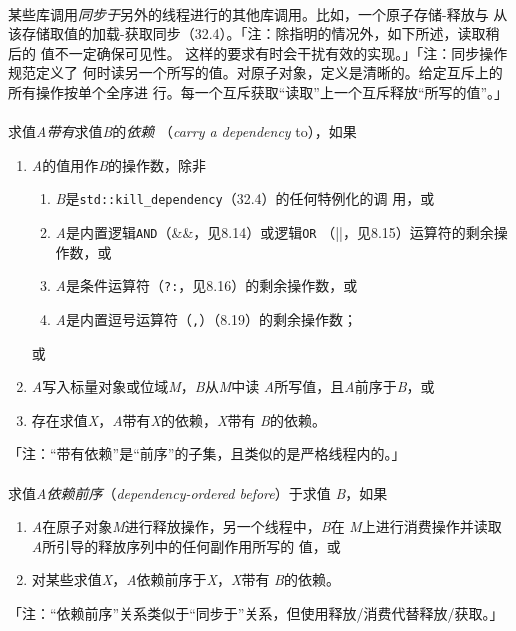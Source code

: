 \paragraph{}
某些库调用\textit{同步于}另外的线程进行的其他库调用。比如，一个原子存储-释放与
从该存储取值的加载-获取同步（32.4）。「注：除指明的情况外，如下所述，读取稍后的
值不一定确保可见性。 这样的要求有时会干扰有效的实现。」「注：同步操作规范定义了
何时读另一个所写的值。对原子对象，定义是清晰的。给定互斥上的所有操作按单个全序进
行。每一个互斥获取``读取''上一个互斥释放``所写的值''。」

\paragraph{}
求值\textit{A}\textit{带有}求值\textit{B}的\textit{依赖}
（\textit{carry a dependency} to），如果
\begin{enumerate}
  \item{\textit{A}的值用作\textit{B}的操作数，除非
      \begin{enumerate}
        \item{\textit{B}是\texttt{std::kill\_dependency}（32.4）的任何特例化的调
          用，或}
        \item{\textit{A}是内置逻辑\texttt{AND}（\&\&，见8.14）或逻辑\texttt{OR}
          （||，见8.15）运算符的剩余操作数，或}
        \item{\textit{A}是条件运算符（\texttt{?:}，见8.16）的剩余操作数，或}
        \item{\textit{A}是内置逗号运算符（\texttt{,}）（8.19）的剩余操作数；}
      \end{enumerate}
      或}
  \item{\textit{A}写入标量对象或位域\textit{M}，\textit{B}从\textit{M}中读
    \textit{A}所写值，且\textit{A}前序于\textit{B}，或}
  \item{存在求值\textit{X}，\textit{A}带有\textit{X}的依赖，\textit{X}带有
    \textit{B}的依赖。}
\end{enumerate}
「注：``带有依赖''是``前序''的子集，且类似的是严格线程内的。」

\paragraph{}
求值\textit{A}\textit{依赖前序}（\textit{dependency-ordered before}）于求值
\textit{B}，如果
\begin{enumerate}
  \item{\textit{A}在原子对象\textit{M}进行释放操作，另一个线程中，\textit{B}在
    \textit{M}上进行消费操作并读取\textit{A}所引导的释放序列中的任何副作用所写的
    值，或}
  \item{对某些求值\textit{X}，\textit{A}依赖前序于\textit{X}，\textit{X}带有
    \textit{B}的依赖。}
\end{enumerate}
「注：``依赖前序''关系类似于``同步于''关系，但使用释放/消费代替释放/获取。」


